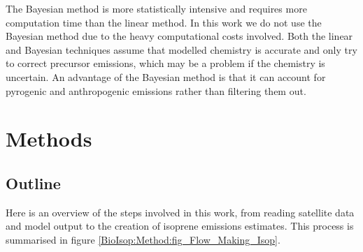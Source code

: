       The Bayesian method is more statistically intensive and requires more computation time than the linear method. 
      In this work we do not use the Bayesian method due to the heavy computational costs involved.
      Both the linear and Bayesian techniques assume that modelled chemistry is accurate and only try to correct precursor emissions, which may be a problem if the chemistry is uncertain.
      An advantage of the Bayesian method is that it can account for pyrogenic and anthropogenic emissions rather than filtering them out.
  
\section{Methods}
  \label{BioIsop:Method}
  
  \subsection{Outline}
    Here is an overview of the steps involved in this work, from reading satellite data and model output to the creation of isoprene emissions estimates.
    This process is summarised in figure \ref{BioIsop:Method:fig_Flow_Making_Isop}.
